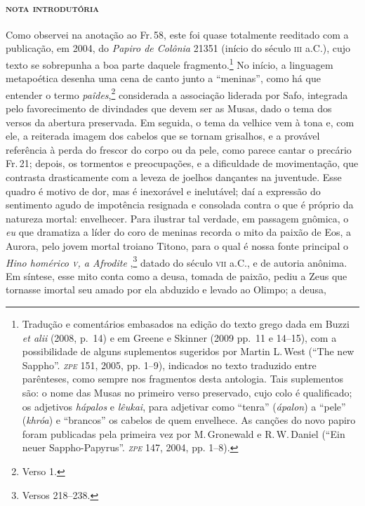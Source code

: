 {\paragraph{\textsc{nota introdutória}}
Como observei na anotação ao Fr.\,58, este foi quase totalmente reeditado com a 
publicação, em 2004, do \textit{Papiro de Colônia} 21351 (início do século \textsc{iii} a.C.), 
cujo texto se sobrepunha a boa parte daquele fragmento.\footnote{Tradução e comentários embasados na edição do texto grego dada em Buzzi \textit{et alii} (2008, p.~14) e em Greene e Skinner (2009 pp.~11 e 14--15), com a possibilidade de alguns suplementos sugeridos por Martin L.\,West (``The new Sappho''. \textit{\textsc{zpe}} 151, 2005, pp. 1--9), indicados no texto traduzido entre parênteses, como sempre nos fragmentos desta antologia. Tais suplementos são: o nome das Musas no primeiro verso preservado, cujo colo é qualificado; os adjetivos \textit{hápalos} e \textit{lêukai}, para adjetivar como ``tenra'' (\textit{ápalon}) a ``pele'' (\textit{khróa}) e ``brancos'' os cabelos de quem envelhece. As canções do novo papiro foram publicadas pela primeira vez por M.\,Gronewald e R.\,W.\,Daniel (``Ein neuer Sappho-Papyrus''. \textit{\textsc{zpe}} 147, 2004, pp. 1--8).} No início, a 
linguagem metapoética desenha uma cena de canto junto a ``meninas'', como há que entender o termo \textit{paîdes},\footnote{Verso 1.} considerada a associação liderada por Safo, 
integrada pelo favorecimento de divindades que devem ser as Musas,
dado o tema dos versos da abertura preservada. Em seguida, o tema da velhice
vem à tona e, com ele, a reiterada imagem dos cabelos que se tornam grisalhos,
e a provável referência à perda do frescor do corpo ou da pele, como parece cantar o precário Fr.\,21; depois, os
tormentos e preocupações, e a dificuldade de movimentação, que contrasta
drasticamente com a leveza de joelhos dançantes na juventude. Esse quadro é
motivo de dor, mas é inexorável e inelutável; daí a expressão do sentimento
agudo de impotência resignada e consolada contra o que é próprio da natureza mortal: envelhecer. Para
ilustrar tal verdade, em passagem gnômica, o \textit{eu} que dramatiza a líder do coro de meninas recorda o
mito da paixão de Eos, a Aurora, pelo jovem mortal troiano Titono, para o qual é nossa fonte
principal o \textit{Hino homérico \textsc{v}, a Afrodite },\footnote{Versos 218--238.} datado do
século \textsc{vii} a.C., e de autoria anônima. Em síntese, esse mito conta como a
deusa, tomada de paixão, pediu a Zeus que tornasse imortal seu amado por ela abduzido e levado ao Olimpo; a deusa,
}
